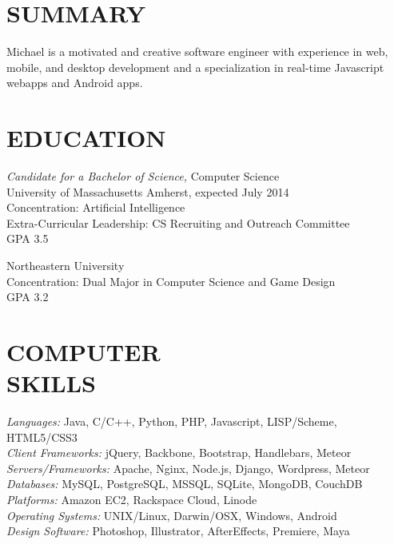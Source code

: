 \documentclass[line,margin]{res}
\begin{document}
\address{169F Brittany Mnr, Amherst, MA 01002}
\address{(781) 264-6283  --  mike@miketurley.com}


\begin{resume}
 
\section{SUMMARY}
	Michael is a motivated and creative software engineer with experience in web, mobile, and desktop development and a specialization in real-time Javascript webapps and Android apps.
 
 
\section{EDUCATION}
	{\sl Candidate for a Bachelor of Science,} Computer Science \\
	University of Massachusetts Amherst, 
	expected July 2014 \\
	Concentration: Artificial Intelligence \\
	Extra-Curricular Leadership: CS Recruiting and Outreach Committee \\
	GPA 3.5

	Northeastern University \\
	Concentration: Dual Major in Computer Science and Game Design \\
	GPA 3.2
 
 
\section{COMPUTER \\ SKILLS}
	{\sl Languages:} Java, C/C++, Python, PHP, Javascript, LISP/Scheme, HTML5/CSS3 \\
	{\sl Client Frameworks:} jQuery, Backbone, Bootstrap, Handlebars, Meteor \\
	{\sl Servers/Frameworks:} Apache, Nginx, Node.js, Django, Wordpress, Meteor \\
	{\sl Databases:} MySQL, PostgreSQL, MSSQL, SQLite, MongoDB, CouchDB \\
	{\sl Platforms:} Amazon EC2, Rackspace Cloud, Linode \\
	{\sl Operating Systems:} UNIX/Linux, Darwin/OSX, Windows, Android \\
	{\sl Design Software:} Photoshop, Illustrator, AfterEffects, Premiere, Maya \\
 

\end{resume}
\end{document}
